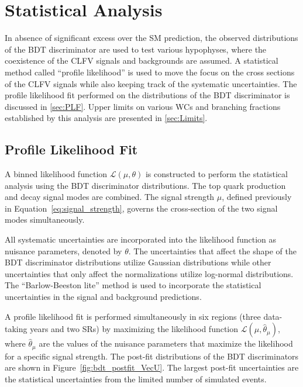 \chapter{Statistical Analysis}
\label{chap:Results}

In absence of significant excess over the \ac{SM} prediction, the observed distributions of the \ac{BDT} discriminator are used to test various hypophyses, where the coexistence of the \ac{CLFV} signals and backgrounds are assumed. A statistical method called ``profile likelihood'' is used to move the focus on the cross sections of the \ac{CLFV} signals while also keeping track of the systematic uncertainties. The profile likelihood fit performed on the distributions of the \ac{BDT} discriminator is discussed in \autoref{sec:PLF}. Upper limits on various \acp{WC} and branching fractions established by this analysis are presented in \autoref{sec:Limits}. 

\section{Profile Likelihood Fit}
\label{sec:PLF}

A binned likelihood function $\mathcal{L}(\mu, \theta)$ is constructed to perform the statistical analysis using the BDT discriminator distributions. The top quark production and decay signal modes are combined. The signal strength $\mu$, defined previously in Equation~\ref{eq:signal_strength}, governs the cross-section of the two signal modes simultaneously. 

All systematic uncertainties are incorporated into the likelihood function as nuisance parameters, denoted by $\theta$. The uncertainties that affect the shape of the \ac{BDT} discriminator distributions utilize Gaussian distributions while other uncertainties that only affect the normalizations utilize log-normal distributions. The ``Barlow-Beeston lite'' method \cite{Barlow:1993dm} is used to incorporate the statistical uncertainties in the signal and background predictions. 

A profile likelihood fit is performed simultaneously in six regions (three data-taking years and two \acp{SR}) by maximizing the likelihood function $\mathcal{L}(\mu, \hat{\theta}_{\mu})$, where $\hat{\theta}_{\mu}$ are the values of the nuisance parameters that maximize the likelihood for a specific signal strength. The post-fit distributions of the \ac{BDT} discriminators are shown in Figure~\ref{fig:bdt_postfit_VecU}. The largest post-fit uncertainties are the statistical uncertainties from the limited number of simulated events.

